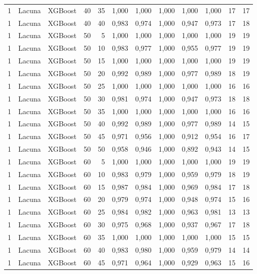 \begin{longtable}{@{}rllrrrrrrrrr@{}}
1 & Lacuna & XGBoost & 40 & 35 & 1,000 & 1,000 & 1,000 & 1,000 & 1,000 & 17 & 17 \\
1 & Lacuna & XGBoost & 40 & 40 & 0,983 & 0,974 & 1,000 & 0,947 & 0,973 & 17 & 18 \\
1 & Lacuna & XGBoost & 50 & 5 & 1,000 & 1,000 & 1,000 & 1,000 & 1,000 & 19 & 19 \\
1 & Lacuna & XGBoost & 50 & 10 & 0,983 & 0,977 & 1,000 & 0,955 & 0,977 & 19 & 19 \\
1 & Lacuna & XGBoost & 50 & 15 & 1,000 & 1,000 & 1,000 & 1,000 & 1,000 & 19 & 19 \\
1 & Lacuna & XGBoost & 50 & 20 & 0,992 & 0,989 & 1,000 & 0,977 & 0,989 & 18 & 19 \\
1 & Lacuna & XGBoost & 50 & 25 & 1,000 & 1,000 & 1,000 & 1,000 & 1,000 & 16 & 16 \\
1 & Lacuna & XGBoost & 50 & 30 & 0,981 & 0,974 & 1,000 & 0,947 & 0,973 & 18 & 18 \\
1 & Lacuna & XGBoost & 50 & 35 & 1,000 & 1,000 & 1,000 & 1,000 & 1,000 & 16 & 16 \\
1 & Lacuna & XGBoost & 50 & 40 & 0,992 & 0,989 & 1,000 & 0,977 & 0,989 & 14 & 15 \\
1 & Lacuna & XGBoost & 50 & 45 & 0,971 & 0,956 & 1,000 & 0,912 & 0,954 & 16 & 17 \\
1 & Lacuna & XGBoost & 50 & 50 & 0,958 & 0,946 & 1,000 & 0,892 & 0,943 & 14 & 15 \\
1 & Lacuna & XGBoost & 60 & 5 & 1,000 & 1,000 & 1,000 & 1,000 & 1,000 & 19 & 19 \\
1 & Lacuna & XGBoost & 60 & 10 & 0,983 & 0,979 & 1,000 & 0,959 & 0,979 & 18 & 19 \\
1 & Lacuna & XGBoost & 60 & 15 & 0,987 & 0,984 & 1,000 & 0,969 & 0,984 & 17 & 18 \\
1 & Lacuna & XGBoost & 60 & 20 & 0,979 & 0,974 & 1,000 & 0,948 & 0,974 & 15 & 16 \\
1 & Lacuna & XGBoost & 60 & 25 & 0,984 & 0,982 & 1,000 & 0,963 & 0,981 & 13 & 13 \\
1 & Lacuna & XGBoost & 60 & 30 & 0,975 & 0,968 & 1,000 & 0,937 & 0,967 & 17 & 18 \\
1 & Lacuna & XGBoost & 60 & 35 & 1,000 & 1,000 & 1,000 & 1,000 & 1,000 & 15 & 15 \\
1 & Lacuna & XGBoost & 60 & 40 & 0,983 & 0,980 & 1,000 & 0,959 & 0,979 & 14 & 14 \\
1 & Lacuna & XGBoost & 60 & 45 & 0,971 & 0,964 & 1,000 & 0,929 & 0,963 & 15 & 16 \\

\end{longtable}
